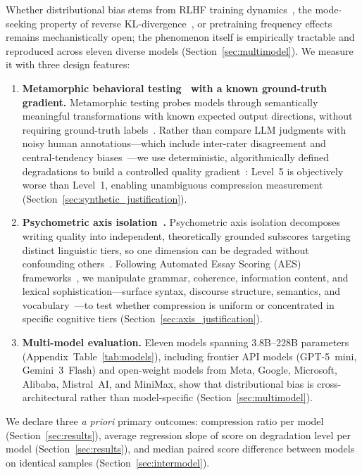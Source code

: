 \documentclass[11pt]{article}
\begin{document}
Whether distributional bias stems from RLHF training
dynamics~\citep{rafailov2023direct}, the mode-seeking property of
reverse KL-divergence~\citep{rafailov2023direct}, or pretraining
frequency effects remains mechanistically open; the phenomenon itself is
empirically tractable and reproduced across eleven diverse models
(Section~\ref{sec:multimodel}). We measure it with three design features:
\begin{enumerate}
    \item \textbf{Metamorphic behavioral testing~\citep{ribeiro2020beyond} with a known ground-truth gradient.}
    Metamorphic testing probes models through semantically meaningful
    transformations with known expected output directions, without
    requiring ground-truth labels~\citep{ribeiro2020beyond}. Rather than
    compare LLM judgments with noisy human annotations---which include
    inter-rater disagreement and central-tendency
    biases~\citep{stevens1971issues}---we use deterministic,
    algorithmically defined degradations to build a controlled quality
    gradient~\citep{ribeiro2020beyond}: Level~5 is objectively worse than
    Level~1, enabling unambiguous compression measurement
    (Section~\ref{sec:synthetic_justification}).
    \item \textbf{Psychometric axis isolation~\citep{attali2006automated,mcnamara2010linguistic}.}
    Psychometric axis isolation decomposes writing quality into
    independent, theoretically grounded subscores targeting distinct
    linguistic tiers, so one dimension can be degraded without
    confounding others~\citep{attali2006automated}. Following Automated
    Essay Scoring (AES) frameworks~\citep{attali2006automated}, we
    manipulate grammar, coherence, information content, and lexical
    sophistication---surface syntax, discourse structure, semantics, and
    vocabulary~\citep{mcnamara2010linguistic}---to test whether
    compression is uniform or concentrated in specific cognitive tiers
    (Section~\ref{sec:axis_justification}).
    \item \textbf{Multi-model evaluation.} Eleven models spanning
    3.8B--228B parameters (Appendix~Table~\ref{tab:models}), including frontier
    API models (GPT-5~mini, Gemini~3~Flash) and open-weight models from
    Meta, Google, Microsoft, Alibaba, Mistral~AI, and MiniMax, show that
    distributional bias is cross-architectural rather than model-specific
    (Section~\ref{sec:multimodel}).
\end{enumerate}
We declare three \emph{a priori} primary outcomes: compression ratio per
model (Section~\ref{sec:results}), average regression slope of score on
degradation level per model (Section~\ref{sec:results}), and median
paired score difference between models on identical samples
(Section~\ref{sec:intermodel}).
\end{document}
